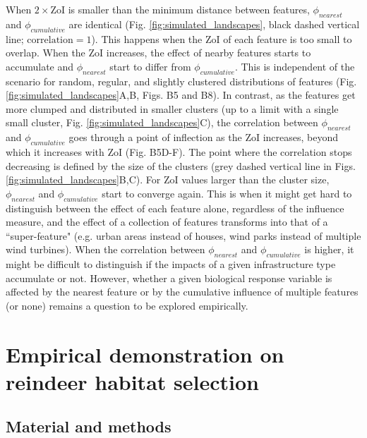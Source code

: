 \documentclass[titlepage]{article}
\begin{document}
When $2 \times \text{ZoI}$ is smaller than the minimum distance between features, $\phi_{nearest}$ and $\phi_{cumulative}$ are identical (Fig. \ref{fig:simulated_landscapes}, black dashed vertical line; $\text{correlation} = 1$). This happens when the ZoI of each feature is too small to overlap. When the ZoI increases, the effect of nearby features starts to accumulate and $\phi_{nearest}$ start to differ from $\phi_{cumulative}$. This is independent of the scenario for random, regular, and slightly clustered distributions of features (Fig. \ref{fig:simulated_landscapes}A,B, Figs. B5 and B8). In contrast, as the features get more clumped and distributed in smaller clusters (up to a limit with a single small cluster, Fig. \ref{fig:simulated_landscapes}C), the correlation between $\phi_{nearest}$ and $\phi_{cumulative}$ goes through a point of inflection as the ZoI increases, beyond which it increases with ZoI (Fig. B5D-F). The point where the correlation stops decreasing is defined by the size of the clusters (grey dashed vertical line in Figs. \ref{fig:simulated_landscapes}B,C). For ZoI values larger than the cluster size, $\phi_{nearest}$ and $\phi_{cumulative}$ start to converge again. %
This is when it might get hard to distinguish between the effect of each feature alone, regardless of the influence measure, and the effect of a collection of features transforms into that of a ``super-feature" (e.g. urban areas instead of houses, wind parks instead of multiple wind turbines). 
When the correlation between $\phi_{nearest}$ and $\phi_{cumulative}$ is higher, it might be difficult to distinguish if the impacts of a given infrastructure type accumulate or not. 
However, whether a given biological response variable is affected by the nearest feature or by the cumulative influence of multiple features (or none) remains a question to be explored empirically. 

\section{Empirical demonstration on reindeer habitat selection}

\subsection{Material and methods}
\end{document}
